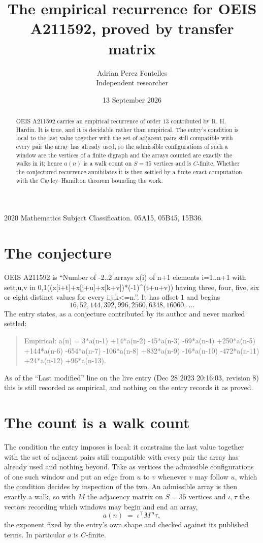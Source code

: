 \documentclass[11pt,a4paper]{article}
\title{The empirical recurrence for OEIS A211592, proved by transfer matrix}
\author{Adrian Perez Fontelles\\ \small Independent researcher}
\date{13 September 2026}
\theoremstyle{plain}
\theoremstyle{definition}
\begin{document}
\maketitle

\begin{abstract}
OEIS A211592 carries an empirical recurrence of order $13$ contributed by R. H. Hardin. It is
true, and it is decidable rather than empirical. The entry's condition is local to the last value together with the set of adjacent pairs still compatible with every pair the array has already used, so
the admissible configurations of such a window are the vertices of a finite digraph and the
arrays counted are exactly the walks in it; hence $a(n)$ is a walk count on $S=35$ vertices
and is $C$-finite. Whether the conjectured recurrence annihilates it is then settled by a
finite exact computation, with the Cayley--Hamilton theorem bounding the work.
\end{abstract}

\noindent\small 2020 Mathematics Subject Classification. 05A15, 05B45, 15B36.\normalsize

\section{The conjecture}

OEIS A211592 is ``Number of -2..2 arrays x(i) of n+1 elements i=1..n+1 with set{t,u,v in 0,1}((x[i+t]+x[j+u]+x[k+v])*(-1)\^{}(t+u+v)) having three, four, five, six or eight distinct values for every i,j,k<=n.''. It has offset $1$ and begins
\[
16, 52, 144, 392, 996, 2560, 6348, 16060,\ \dots
\]
The entry states, as a conjecture contributed by its author and never marked settled:
\begin{quote}
Empirical: a(n) = 3*a(n-1) +14*a(n-2) -45*a(n-3) -69*a(n-4) +250*a(n-5) +144*a(n-6) -654*a(n-7) -106*a(n-8) +832*a(n-9) -16*a(n-10) -472*a(n-11) +24*a(n-12) +96*a(n-13).
\end{quote}
As of the ``Last modified'' line on the live entry (Dec 28 2023 20:16:03, revision 8) this is still
recorded as empirical, and nothing on the entry records it as proved.

\section{The count is a walk count}

The condition the entry imposes is local: it constrains the last value together with the set of adjacent pairs still compatible with every pair the array has already used and nothing beyond. Take as
vertices the admissible configurations of one such window and put an edge from $u$ to $v$
whenever $v$ may follow $u$, which the condition decides by inspection of the two. An
admissible array is then exactly a walk, so with $M$ the adjacency matrix on $S=35$ vertices
and $\iota,\tau$ the vectors recording which windows may begin and end an array,
\[
a(n)\;=\;\iota^{\!\top}M^{\,n}\tau ,
\]
the exponent fixed by the entry's own shape and checked against its published terms. In
particular $a$ is $C$-finite.
\end{document}
